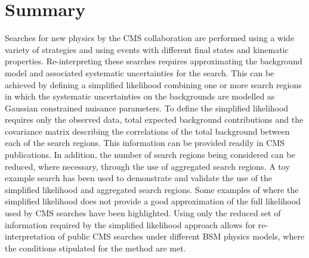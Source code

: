 \section{Summary}
\label{sec:conclusions}
Searches for new physics by the CMS collaboration are performed using a wide variety of 
strategies and using events with different final states and kinematic properties. 
Re-interpreting these searches requires approximating the background model
and associated systematic uncertainties for the search. This can be 
achieved by defining a simplified likelihood combining one or more search regions in which the systematic 
uncertainties on the backgrounds are modelled  as Gaussian  constrained nuisance parameters. 
To define the simplified likelihood requires only the observed data, total expected background contributions and 
the covariance matrix describing the correlations of the total background between each of the search regions. 
This information can be provided readily in CMS publications. In addition, the number of search regions being 
considered can be reduced, where necessary, through the use of aggregated search regions. 
A toy example search has been used to demonstrate and validate the use of the simplified likelihood and aggregated search 
regions. Some examples of where the simplified likelihood does not provide a good approximation of the 
full likelihood used by CMS searches have been highlighted. Using only the reduced set of information required by the simplified likelihood 
approach allows for re-interpretation of public CMS searches under different BSM physics models, where the conditions stipulated for the 
method are met.

